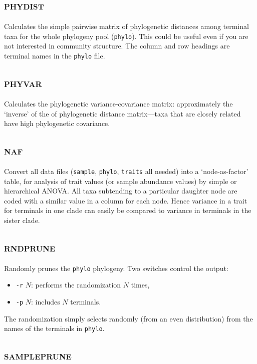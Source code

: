 \documentclass[12pt,letterpaper]{article}
\begin{document}
\subsection{\scshape phydist}

Calculates the simple pairwise matrix of phylogenetic distances among
terminal taxa for the whole phylogeny pool (\verb|phylo|). This could
be useful even if you are not interested in community structure. The
column and row headings are terminal names in the \verb|phylo| file.

\subsection{\scshape phyvar}

Calculates the phylogenetic variance-covariance matrix: approximately
the `inverse' of the of phylogenetic distance matrix---taxa that are
closely related have high phylogenetic covariance.

\subsection{\scshape naf}

Convert all data files (\verb|sample|, \verb|phylo|, \verb|traits| all
needed) into a `node-as-factor' table, for analysis of trait values
(or sample abundance values) by simple or hierarchical ANOVA.  All
taxa subtending to a particular daughter node are coded with a similar
value in a column for each node.  Hence variance in a trait for
terminals in one clade can easily be compared to variance in terminals
in the sister clade.

\subsection{\scshape rndprune}

Randomly prunes the \verb|phylo| phylogeny.  Two switches control the
output:
\begin{itemize}
\item[] \texttt{-r} $N$: performs the randomization $N$ times, 
\item[] \texttt{-p} $N$: includes $N$ terminals.
\end{itemize}
The randomization simply selects randomly (from an even distribution)
from the names of the terminals in \verb|phylo|.

\subsection{\scshape sampleprune}
\end{document}
